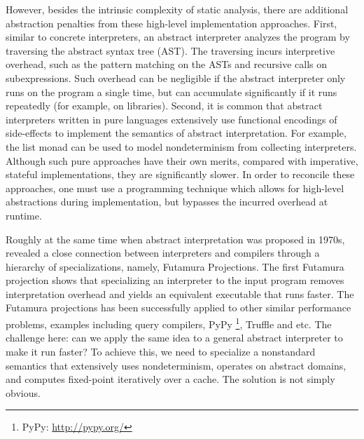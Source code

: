 However, besides the intrinsic complexity of static analysis, there are
additional abstraction penalties from these high-level implementation
approaches. First, similar to concrete interpreters, an abstract interpreter
analyzes the program by traversing the abstract syntax tree (AST). The traversing incurs
interpretive overhead, such as the pattern matching on the ASTs and recursive
calls on subexpressions. Such overhead can be negligible if the abstract
interpreter only runs on the program a single time, but can accumulate
significantly if it runs repeatedly (for example, on libraries).  Second, it is
common that abstract interpreters written in pure languages extensively use
functional encodings of side-effects to implement the semantics of abstract interpretation. 
For example, the list monad can be used to model nondeterminism from collecting
interpreters.
Although such pure approaches have their own merits, compared with imperative,
stateful implementations, they are significantly slower.  In order to
reconcile these approaches, one must use a programming technique which allows
for high-level abstractions during implementation, but bypasses the
incurred overhead at runtime.

Roughly at the same time when abstract interpretation was proposed in
1970s, \citet{futamura1971partial} revealed a close
connection between interpreters and compilers through a hierarchy of
specializations, namely, Futamura Projections. The first Futamura
projection shows that specializing an interpreter to the input program
removes interpretation overhead and yields an equivalent executable
that runs faster. The Futamura projections has been successfully applied to 
other similar performance problems, examples including
query compilers\cite{DBLP:conf/sigmod/TahboubER18}, PyPy \footnote{PyPy:
\url{http://pypy.org/}}, Truffle \cite{Marr:2015:TVP:2814270.2814275} and etc.
The challenge here: can we apply the same idea to a general abstract interpreter
to make it run faster? To achieve this, we need to specialize a nonstandard
semantics that extensively uses nondeterminism, operates on abstract domains,
and computes fixed-point iteratively over a cache. The solution is not simply obvious.

